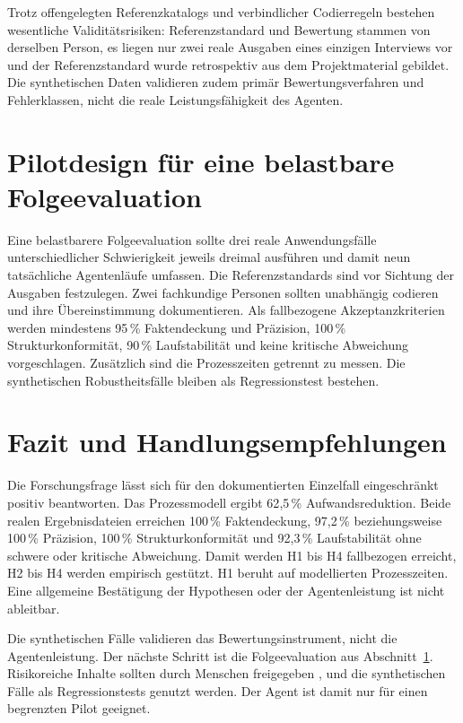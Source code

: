 \documentclass[
  10pt,
  ngerman,
  a4paper,
  toc=graduated,
  numbers=noenddot,
  headings=standardclasses,
  nonumberlist
]{scrartcl}
\newcommand{\pct}[1]{#1\,\%}
\begin{document}
Trotz offengelegten Referenzkatalogs und verbindlicher Codierregeln bestehen wesentliche Validitätsrisiken: Referenzstandard und Bewertung stammen von derselben Person, es liegen nur zwei reale Ausgaben eines einzigen Interviews vor und der Referenzstandard wurde retrospektiv aus dem Projektmaterial gebildet. Die synthetischen Daten validieren zudem primär Bewertungsverfahren und Fehlerklassen, nicht die reale Leistungsfähigkeit des Agenten.

\section{Pilotdesign für eine belastbare Folgeevaluation}
\label{sec:pilotdesign}

Eine belastbarere Folgeevaluation sollte drei reale Anwendungsfälle unterschiedlicher Schwierigkeit jeweils dreimal ausführen und damit neun tatsächliche Agentenläufe umfassen. Die Referenzstandards sind vor Sichtung der Ausgaben festzulegen. Zwei fachkundige Personen sollten unabhängig codieren und ihre Übereinstimmung dokumentieren. Als fallbezogene Akzeptanzkriterien werden mindestens \pct{95} Faktendeckung und Präzision, \pct{100} Strukturkonformität, \pct{90} Laufstabilität und keine kritische Abweichung vorgeschlagen. Zusätzlich sind die Prozesszeiten getrennt zu messen. Die synthetischen Robustheitsfälle bleiben als Regressionstest bestehen.

\section{Fazit und Handlungsempfehlungen}

Die Forschungsfrage lässt sich für den dokumentierten Einzelfall eingeschränkt positiv beantworten. Das Prozessmodell ergibt \pct{62{,}5} Aufwandsreduktion. Beide realen Ergebnisdateien erreichen \pct{100} Faktendeckung, \pct{97{,}2} beziehungsweise \pct{100} Präzision, \pct{100} Strukturkonformität und \pct{92{,}3} Laufstabilität ohne schwere oder kritische Abweichung. Damit werden H1 bis H4 fallbezogen erreicht, H2 bis H4 werden empirisch gestützt. H1 beruht auf modellierten Prozesszeiten. Eine allgemeine Bestätigung der Hypothesen oder der Agentenleistung ist nicht ableitbar.

Die synthetischen Fälle validieren das Bewertungsinstrument, nicht die Agentenleistung. Der nächste Schritt ist die Folgeevaluation aus Abschnitt~\ref{sec:pilotdesign}. Risikoreiche Inhalte sollten durch Menschen freigegeben \cite{gelashvili2025}, \cite[S.~2248]{kernanfreire2026} und die synthetischen Fälle als Regressionstests genutzt werden. Der Agent ist damit nur für einen begrenzten Pilot geeignet.
\end{document}
